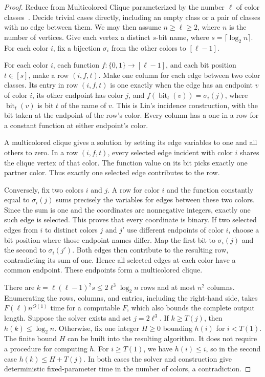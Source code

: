\documentclass[11pt]{article}
\begin{document}
\begin{proof}
Reduce from Multicolored Clique parameterized by the number \(\ell\)
of color classes~\cite{cfk}. Decide trivial cases directly, including
an empty class or a pair of classes with no edge between them.
We may then assume \(n\ge\ell\ge2\), where \(n\) is the number of
vertices. Give each vertex a distinct \(s\)-bit name, where
\(s=\lceil\log_2 n\rceil\). For each color \(i\), fix a bijection
\(\sigma_i\) from the other colors to \([\ell-1]\).

For each color \(i\), each function \(f:\{0,1\}\to[\ell-1]\), and each
bit position \(t\in[s]\), make a row \((i,f,t)\). Make one column for
each edge between two color classes. Its entry in row \((i,f,t)\) is
one exactly when the edge has an endpoint \(v\) of color \(i\), its
other endpoint has color \(j\), and \(f(\operatorname{bit}_t(v))=
\sigma_i(j)\), where \(\operatorname{bit}_t(v)\) is bit \(t\) of
the name of \(v\). This is Lin's incidence construction, with the
bit taken at the endpoint of the row's color. Every column has a
one in a row for a constant function at either endpoint's color.

A multicolored clique gives a solution by setting its edge variables
to one and all others to zero. In a row \((i,f,t)\), every selected
edge incident with color \(i\) shares the clique vertex of that color.
The function value on its bit picks exactly one partner color. Thus
exactly one selected edge contributes to the row.

Conversely, fix two colors \(i\) and \(j\). A row for color \(i\) and
the function constantly equal to \(\sigma_i(j)\) sums precisely the
variables for edges between these two colors. Since the sum is one
and the coordinates are nonnegative integers, exactly one such
edge is selected. This proves that every coordinate is binary. If
two selected edges from \(i\) to distinct colors \(j\) and \(j'\)
use different endpoints of color \(i\), choose a bit position where
those endpoint names differ. Map the first bit to \(\sigma_i(j)\)
and the second to \(\sigma_i(j')\). Both edges then contribute to
the resulting row, contradicting its sum of one. Hence all selected
edges at each color have a common endpoint. These endpoints form
a multicolored clique.

There are \(k=\ell(\ell-1)^2s\le 2\ell^3\log_2 n\) rows and at most
\(n^2\) columns. Enumerating the rows, columns, and entries, including
the right-hand side, takes \(F(\ell)n^{O(1)}\) time for a computable
\(F\), which also bounds the complete output length. Suppose the solver
exists and set \(j=2\ell^3\). If \(k\ge T(j)\), then \(h(k)\le\log_2 n\).
Otherwise, fix one integer \(H\ge0\) bounding \(h(i)\) for \(i<T(1)\).
The finite bound \(H\) can be built into the resulting algorithm. It does
not require a procedure for computing \(h\).
For \(i\ge T(1)\), we have \(h(i)\le i\), so in the second case
\(h(k)\le H+T(j)\). In both cases the solver and construction give
deterministic fixed-parameter time in the number of colors, a contradiction.
\end{proof}
\end{document}
